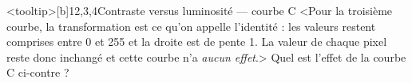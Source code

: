 \begin{quiz}[title={Photographie numérique}]
\vspace{-\baselineskip}
%
\begin{quizquestion*}<tooltip>[b]{1}{2,3,4}{Contraste {\upshape versus} luminosité --- courbe C}
<Pour la troisième courbe, la transformation est ce qu'on appelle l'identité : les valeurs restent comprises entre 0 et 255 et la droite est de pente 1. La valeur de chaque pixel reste donc inchangé et cette courbe n'a \emph{aucun effet}.>
Quel est l'effet de la courbe C ci-contre ?
\end{quizquestion*}


\end{quiz}
